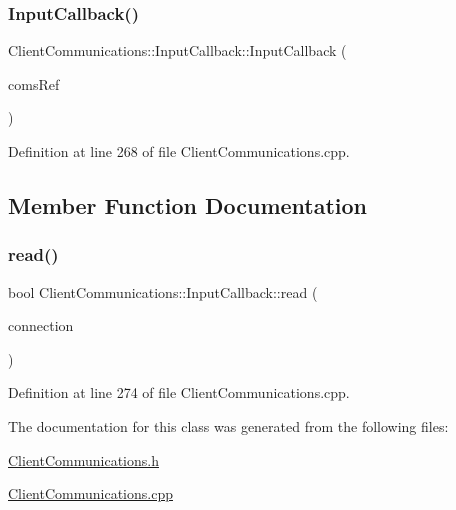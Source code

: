 \subsubsection{\texorpdfstring{Input\+Callback()}{InputCallback()}}
{\footnotesize\ttfamily Client\+Communications\+::\+Input\+Callback\+::\+Input\+Callback (\begin{DoxyParamCaption}\item[{\hyperlink{classocra__recipes_1_1ClientCommunications}{Client\+Communications} \&}]{coms\+Ref }\end{DoxyParamCaption})}



Definition at line 268 of file Client\+Communications.\+cpp.



\subsection{Member Function Documentation}
\hypertarget{classocra__recipes_1_1ClientCommunications_1_1InputCallback_ac35b3e10d832570b5559afd89d1a58c5}{}\label{classocra__recipes_1_1ClientCommunications_1_1InputCallback_ac35b3e10d832570b5559afd89d1a58c5} 
\subsubsection{\texorpdfstring{read()}{read()}}
{\footnotesize\ttfamily bool Client\+Communications\+::\+Input\+Callback\+::read (\begin{DoxyParamCaption}\item[{yarp\+::os\+::\+Connection\+Reader \&}]{connection }\end{DoxyParamCaption})\hspace{0.3cm}{\ttfamily [virtual]}}



Definition at line 274 of file Client\+Communications.\+cpp.



The documentation for this class was generated from the following files\+:\begin{DoxyCompactItemize}
\item 
\hyperlink{ClientCommunications_8h}{Client\+Communications.\+h}\item 
\hyperlink{ClientCommunications_8cpp}{Client\+Communications.\+cpp}\end{DoxyCompactItemize}

